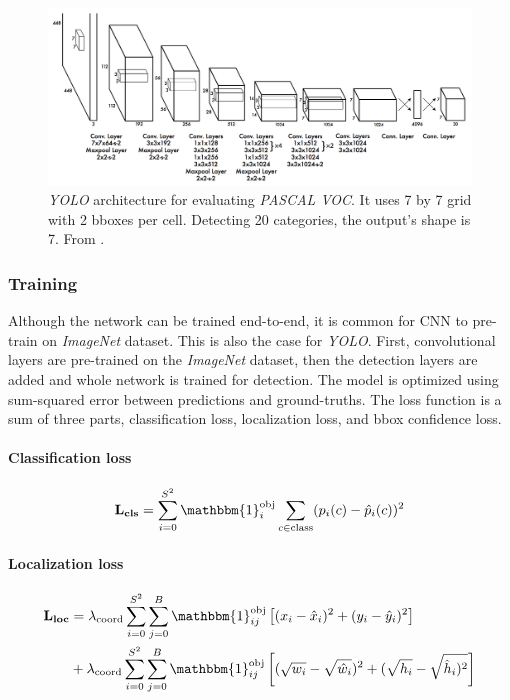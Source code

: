 \begin{figure}
    \centering
    \includegraphics[width=\textwidth]{img/yoylo}
    \caption{\textit{YOLO} architecture for evaluating \textit{PASCAL VOC}. It uses 7 by 7 grid with 2 bboxes per cell. Detecting 20 categories, the output's shape is 7. From \cite[fig. 3]{bib:yolo}.}
    \label{fig:yolo} 
\end{figure}

\subsubsection{Training}
Although the network can be trained end-to-end, it is common for CNN to pre-train on \textit{ImageNet} dataset. This is also the case for \textit{YOLO}. First, convolutional layers are pre-trained on the \textit{ImageNet} dataset, then the detection layers are added and whole network is trained for detection. The model is optimized using sum-squared error between predictions and ground-truths. The loss function is a sum of three parts, classification loss, localization loss, and bbox confidence loss. 

\paragraph{Classification loss}
\begin{align*}
\mathbf{L_{cls}} = \sum_{i=0}^{S^2}\mathbbm{1}_i^{\text{obj}} \sum_{c\in \text{class}} (p_i(c) - \hat{p}_i(c))^2
\end{align*}

\paragraph{Localization loss}
\begin{align*}
\mathbf{L_{loc}} &= \lambda_{\text{coord}} \sum_{i=0}^{S^2} \sum_{j=0}^B \mathbbm{1}_{ij}^{\text{obj}} \left[(x_i - \hat{x}_i)^2 + (y_i - \hat{y}_i)^2\right] \\
 &+  \lambda_{\text{coord}} \sum_{i=0}^{S^2} \sum_{j=0}^B \mathbbm{1}_{ij}^{\text{obj}} \left[(\sqrt{w_i} - \sqrt{\hat{w}_i})^2 + (\sqrt{h_i} - \sqrt{\hat{h}_i)^2}\right]
\end{align*}

